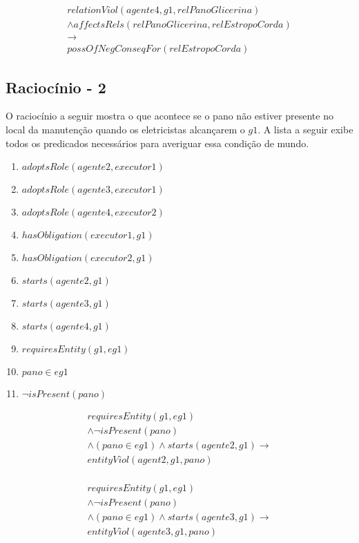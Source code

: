 \begin{eqnarray}\nonumber
	relationViol(agente4,g1,relPanoGlicerina)  \nonumber \\ 
	\wedge affectsRels(relPanoGlicerina,relEstropoCorda)   \nonumber \\ 
	\to \nonumber \\  
	possOfNegConseqFor(relEstropoCorda) 
\end{eqnarray}



\subsection{Raciocínio - 2} 
\label{raciocinio2}
O raciocínio a seguir mostra o que acontece se o pano não estiver presente no local da manutenção quando os eletricistas alcançarem o $g1$. A lista a seguir exibe todos os predicados necessários para averiguar essa condição de mundo. 


\begin{enumerate}
	\item $adoptsRole(agente2,executor1)$ 
	\item $adoptsRole(agente3,executor1)$	 	
	\item $adoptsRole(agente4,executor2)$	 
	\item $hasObligation(executor1,g1)$
	\item $hasObligation(executor2,g1)$
	\item $starts(agente2,g1)$ 
	\item $starts(agente3,g1)$	 	
	\item $starts(agente4,g1)$	
	\item $requiresEntity(g1,eg1)$		
	\item $pano \in eg1$
	\item $\neg isPresent(pano)$
\end{enumerate}

\begin{eqnarray}\nonumber
	requiresEntity(g1,eg1) \nonumber \\ 
	\wedge \neg isPresent(pano) 	\nonumber \\ 
	\wedge (pano \in eg1) \wedge starts(agente2,g1) \to \nonumber \\ 
	entityViol(agent2,g1,pano) \nonumber \\
\end{eqnarray}

\begin{eqnarray}\nonumber
	requiresEntity(g1,eg1) \nonumber \\ 
	\wedge \neg isPresent(pano) 	\nonumber \\ 
	\wedge (pano \in eg1) \wedge starts(agente3,g1) \to \nonumber \\ 
	entityViol(agente3,g1,pano) \nonumber \\
\end{eqnarray}

